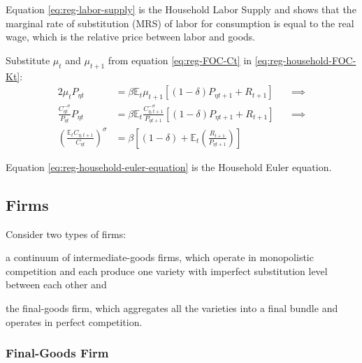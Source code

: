 \documentclass[
	thesis.tex
	]{subfiles}
\begin{document}
Equation \ref{eq:reg-labor-supply} is the Household Labor Supply and shows that the marginal rate of substitution (MRS) of labor for consumption is equal to the real wage, which is the relative price between labor and goods.

Substitute $\mu_t$ and $\mu_{t+1}$ from equation \ref{eq:reg-FOC-Ct} in \ref{eq:reg-household-FOC-Kt}:
\begin{alignat}{2}
	\mu_t P_{\eta t} & = \beta \mathbb{E}_t \mu_{t+1} [(1-\delta) P_{\eta t+1} + R_{t+1}] \quad &\implies \nonumber \\
	\frac{C_{\eta t}^{-\sigma}}{P_{\eta t}} P_{\eta t} & = \beta \mathbb{E}_t \frac{C_{\eta, t+1}^{-\sigma}}{P_{\eta t+1}} [(1-\delta) P_{\eta t+1} + R_{t+1}] &\implies \nonumber \\
	\left( \frac{\mathbb{E}_t C_{\eta, t+1}}{C_{\eta t}} \right)^\sigma & = \beta \left[ (1-\delta) + \mathbb{E}_t \left(\frac{R_{t+1}}{P_{\eta t+1}}\right) \right] \label{eq:reg-household-euler-equation}
\end{alignat}

Equation \ref{eq:reg-household-euler-equation} is the Household Euler equation.


\subsection*{Firms}

Consider two types of firms: 
\begin{enumerate*}[label=(\arabic*)]
	\item a continuum of intermediate-goods firms, which operate in monopolistic competition and each produce one variety with imperfect substitution level between each other and
	
	\item the final-goods firm, which aggregates all the varieties into a final bundle and operates in perfect competition.
\end{enumerate*}


\subsubsection{Final-Goods Firm}
\end{document}
